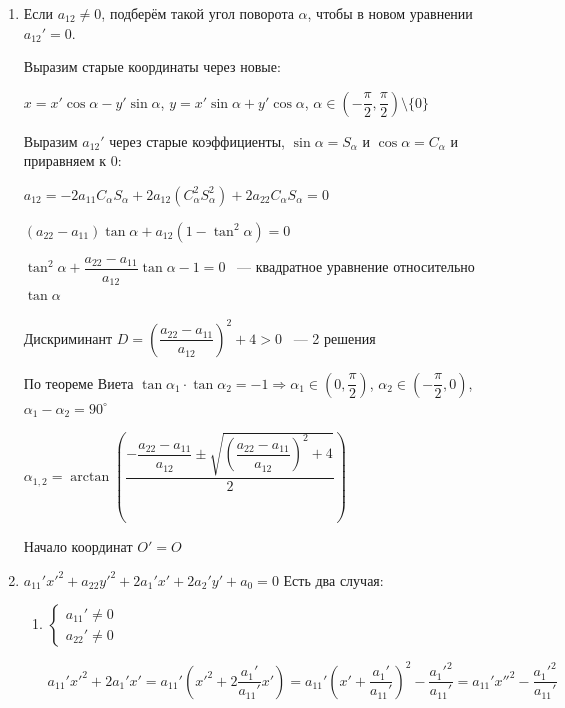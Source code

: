 \documentclass[twoside]{book}
\begin{document}
\begin{enumerate}
    \item Если \(a_{12} \neq 0\), подберём такой угол поворота \(\alpha\), чтобы в новом уравнении \(a_{12}' = 0\).

          Выразим старые координаты через новые:

          \(x = x' \cos \alpha - y' \sin \alpha\), \(y = x' \sin \alpha + y' \cos \alpha\), \(\alpha \in \left(-\dfrac{\pi}{2}, \dfrac{\pi}{2}\right) \setminus \{0\}\)

          Выразим \(a_{12}'\) через старые коэффициенты, \(\sin \alpha = S_\alpha\) и \(\cos \alpha = C_\alpha\) и приравняем к \(0\):

          \(a_{12} = -2 a_{11} C_\alpha S_\alpha + 2 a_{12} (C_\alpha^2 S_\alpha^2) + 2 a_{22} C_\alpha S_\alpha = 0\)

          \((a_{22} - a_{11}) \tan \alpha + a_{12} (1 - \tan^2 \alpha) = 0\)

          \(\tan^2 \alpha + \dfrac{a_{22} - a_{11}}{a_{12}} \tan \alpha - 1 = 0\) ~--- квадратное уравнение относительно \(\tan \alpha\)

          Дискриминант \(D = \left(\dfrac{a_{22} - a_{11}}{a_{12}}\right) ^ 2 + 4 > 0\) ~--- 2 решения

          По теореме Виета \(\tan \alpha_1 \cdot \tan \alpha_2 = -1 \Rightarrow \alpha_1 \in \left(0, \dfrac{\pi}{2}\right)\), \(\alpha_2 \in \left(-\dfrac{\pi}{2}, 0\right)\), \(\alpha_1 - \alpha_2 = 90^\circ\)

          \(\alpha_{1, 2} = \arctan\left(\dfrac{-\dfrac{a_{22} - a_{11}}{a_{12}} \pm \sqrt{\left(\dfrac{a_{22} - a_{11}}{a_{12}}\right) ^ 2 + 4}}{2}\right)\)

          Начало координат \(O' = O\)

    \item \(a_{11}' x'^2 + a_{22} y'^2 + 2 a_1' x' + 2 a_2' y' + a_0 = 0\)
          Есть два случая:
          \begin{enumerate}
              \item \(\begin{cases}
                        a_{11}' \neq 0 \\
                        a_{22}' \neq 0
                    \end{cases}\)

                    \(a_{11}' x'^2 + 2 a_1' x' = a_{11}' \left(x'^2 + 2 \dfrac{a_1'}{a_{11}'} x'\right) = a_{11}' \left(x' + \dfrac{a_1'}{a_{11}'}\right)^2 - \dfrac{a_1'^2}{a_{11}'} = a_{11}' x''^2 - \dfrac{a_1'^2}{a_{11}'}\)


\end{enumerate}
\end{enumerate}
\end{document}
